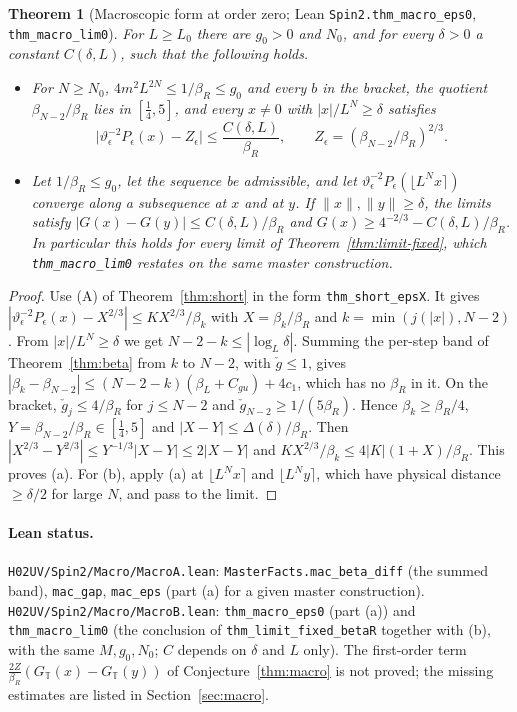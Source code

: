 \documentclass[11pt]{amsart}
\newtheorem{theorem}{Theorem}[section]
\theoremstyle{definition}
\theoremstyle{remark}
\numberwithin{equation}{section}
\newcommand{\T}{\mathbb{T}}
\begin{document}
\begin{theorem}[Macroscopic form at order zero; Lean \texttt{Spin2.thm\_macro\_eps0}, \texttt{thm\_macro\_lim0}]\label{thm:macro0}
For $L\ge L_0$ there are $g_0>0$ and $N_0$, and for every $\delta>0$ a constant $C(\delta,L)$, such that the following holds.
\begin{itemize}
\item[(a)] For $N\ge N_0$, $4m^2L^{2N}\le1/\beta_R\le g_0$ and every $b$ in the bracket, the quotient
$\beta_{N-2}/\beta_R$ lies in $[\frac14,5]$, and every $x\ne0$ with $|x|/L^N\ge\delta$ satisfies
\[
  \bigl|\vartheta_\epsilon^{-2}P_\epsilon(x)-Z_\epsilon\bigr|\le\frac{C(\delta,L)}{\beta_R},\qquad Z_\epsilon=(\beta_{N-2}/\beta_R)^{2/3}.
\]
\item[(b)] Let $1/\beta_R\le g_0$, let the sequence be admissible, and let $\vartheta_\epsilon^{-2}P_\epsilon(\lfloor L^Nx\rceil)$
converge along a subsequence at $x$ and at $y$. If $\|x\|,\|y\|\ge\delta$, the limits satisfy
$|G(x)-G(y)|\le C(\delta,L)/\beta_R$ and $G(x)\ge4^{-2/3}-C(\delta,L)/\beta_R$. In particular this holds for every limit
of Theorem~\ref{thm:limit-fixed}, which \texttt{thm\_macro\_lim0} restates on the same master construction.
\end{itemize}
\end{theorem}

\begin{proof}
Use (A) of Theorem~\ref{thm:short} in the form \texttt{thm\_short\_epsX}. It gives
$|\vartheta_\epsilon^{-2}P_\epsilon(x)-X^{2/3}|\le KX^{2/3}/\beta_k$ with $X=\beta_k/\beta_R$ and $k=\min(j(|x|),N-2)$.
From $|x|/L^N\ge\delta$ we get $N-2-k\le|\log_L\delta|$. Summing the per-step band of Theorem~\ref{thm:beta} from $k$ to
$N-2$, with $\check g\le1$, gives $|\beta_k-\beta_{N-2}|\le(N-2-k)(\beta_L+C_{gu})+4c_1$, which has no $\beta_R$ in it.
On the bracket, $\check g_j\le4/\beta_R$ for $j\le N-2$ and $\check g_{N-2}\ge1/(5\beta_R)$. Hence
$\beta_k\ge\beta_R/4$, $Y=\beta_{N-2}/\beta_R\in[\frac14,5]$ and $|X-Y|\le\Delta(\delta)/\beta_R$. Then
$|X^{2/3}-Y^{2/3}|\le Y^{-1/3}|X-Y|\le2|X-Y|$ and $KX^{2/3}/\beta_k\le4|K|(1+X)/\beta_R$. This proves (a).
For (b), apply (a) at $\lfloor L^Nx\rceil$ and $\lfloor L^Ny\rceil$, which have physical distance $\ge\delta/2$ for large
$N$, and pass to the limit.
\end{proof}

\paragraph{Lean status.} \texttt{H02UV/Spin2/Macro/MacroA.lean}: \texttt{MasterFacts.mac\_beta\_diff} (the summed band),
\texttt{mac\_gap}, \texttt{mac\_eps} (part (a) for a given master construction). \texttt{H02UV/Spin2/Macro/MacroB.lean}:
\texttt{thm\_macro\_eps0} (part (a)) and \texttt{thm\_macro\_lim0} (the conclusion of \texttt{thm\_limit\_fixed\_betaR}
together with (b), with the same $M,g_0,N_0$; $C$ depends on $\delta$ and $L$ only). The first-order term
$\frac{2Z}{\beta_R}(G_\T(x)-G_\T(y))$ of Conjecture~\ref{thm:macro} is not proved; the missing estimates are listed in Section~\ref{sec:macro}.
\end{document}
